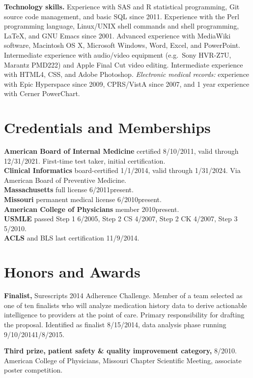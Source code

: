 \documentclass[12pt]{article}
\begin{document}
\textbf{Technology skills.} Experience with SAS and R statistical
programming, Git source code management, and basic SQL since 2011.
Experience with the Perl programming language, Linux/UNIX shell
commands and shell programming, \LaTeX, and GNU Emacs since 2001.
Advanced experience with MediaWiki software, Macintosh OS X, Microsoft
Windows, Word, Excel, and PowerPoint. Intermediate experience with
audio/video equipment (e.g.\ Sony HVR-Z7U, Marantz PMD222) and Apple
Final Cut video editing. Intermediate experience with HTML4, CSS, and
Adobe Photoshop. \emph{Electronic medical records:} experience with
Epic Hyperspace since 2009, CPRS/VistA since 2007, and 1 year
experience with Cerner PowerChart.


\section*{Credentials and Memberships}

\textbf{American Board of Internal Medicine} certified 8/10/2011,
valid through 12/31/2021. First-time test taker, initial
certification.\\
\textbf{Clinical Informatics} board-certified 1/1/2014, valid through
1/31/2024. Via American Board of Preventive Medicine.\\
\textbf{Massachusetts} full license 6/2011\ndash{}present.\\
\textbf{Missouri} permanent medical license 6/2010\ndash{}present.\\
\textbf{American College of Physicians} member 2010\ndash{}present.\\
\textbf{USMLE} passed Step 1 6/2005, Step 2 CS 4/2007, Step 2 CK 4/2007, Step 3
5/2010.\\
\textbf{ACLS} and BLS last certification 11/9/2014.

\section*{Honors and Awards}

\textbf{Finalist,} Surescripts 2014 Adherence Challenge. Member of a
team selected as one of ten finalists who will analyze medication
history data to derive actionable intelligence to providers at the
point of care. Primary responsibility for drafting the proposal.
Identified as finalist 8/15/2014, data analysis phase running
9/10/2014\ndash{}1/8/2015.

\textbf{Third prize, patient safety \& quality improvement category,} 8/2010.
American College of Physicians, Missouri Chapter Scientific Meeting,
associate poster competition.
\end{document}
